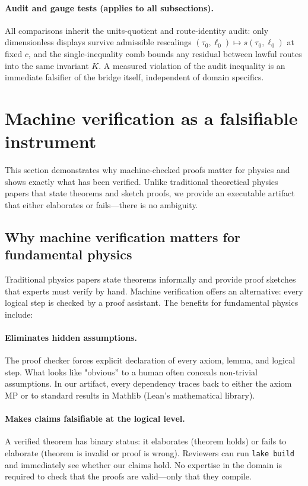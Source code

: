 \documentclass[11pt]{article}
\begin{document}
\paragraph{Audit and gauge tests (applies to all subsections).} All comparisons inherit the units-quotient and route-identity audit: only dimensionless displays survive admissible rescalings \((\tau_0,\ell_0)\mapsto s(\tau_0,\ell_0)\) at fixed \(c\), and the single-inequality comb bounds any residual between lawful routes into the same invariant \(K\). A measured violation of the audit inequality is an immediate falsifier of the bridge itself, independent of domain specifics.%

\section{Machine verification as a falsifiable instrument}\label{sec:verification-instrument}

This section demonstrates why machine-checked proofs matter for physics and shows exactly what has been verified. Unlike traditional theoretical physics papers that state theorems and sketch proofs, we provide an executable artifact that either elaborates or fails—there is no ambiguity.

\subsection{Why machine verification matters for fundamental physics}

Traditional physics papers state theorems informally and provide proof sketches that experts must verify by hand. Machine verification offers an alternative: every logical step is checked by a proof assistant. The benefits for fundamental physics include:

\paragraph{Eliminates hidden assumptions.} The proof checker forces explicit declaration of every axiom, lemma, and logical step. What looks like "obvious'' to a human often conceals non-trivial assumptions. In our artifact, every dependency traces back to either the axiom MP or to standard results in Mathlib (Lean's mathematical library).

\paragraph{Makes claims falsifiable at the logical level.} A verified theorem has binary status: it elaborates (theorem holds) or fails to elaborate (theorem is invalid or proof is wrong). Reviewers can run \texttt{lake build} and immediately see whether our claims hold. No expertise in the domain is required to check that the proofs are valid—only that they compile.
\end{document}
